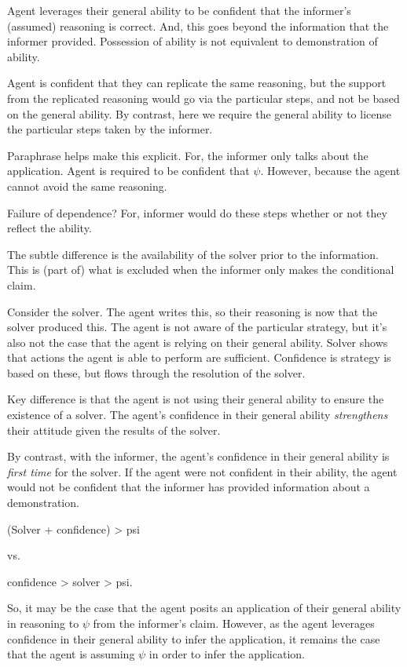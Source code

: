 \documentclass[10pt]{article}
\newcommand{\hozlinedash}[0]{%
  \noindent\hdashrule[0.5ex][c]{\textwidth}{.1pt}{2.5pt}
}
\begin{document}
\hozlinedash

Agent leverages their general ability to be confident that the informer's (assumed) reasoning is correct.
And, this goes beyond the information that the informer provided.
Possession of ability is not equivalent to demonstration of ability.

Agent is confident that they can replicate the same reasoning, but the support from the replicated reasoning would go via the particular steps, and not be based on the general ability.
By contrast, here we require the general ability to license the particular steps taken by the informer.

Paraphrase helps make this explicit.
For, the informer only talks about the application.
Agent is required to be confident that \(\psi\).
However, because the agent cannot avoid the same reasoning.

Failure of dependence?
For, informer would do these steps whether or not they reflect the ability.

The subtle difference is the availability of the solver prior to the information.
This is (part of) what is excluded when the informer only makes the conditional claim.

Consider the solver.
The agent writes this, so their reasoning is now that the solver produced this.
The agent is not aware of the particular strategy, but it's also not the case that the agent is relying on their general ability.
Solver shows that actions the agent is able to perform are sufficient.
Confidence is strategy is based on these, but flows through the resolution of the solver.

Key difference is that the agent is not using their general ability to ensure the existence of a solver.
The agent's confidence in their general ability \emph{strengthens} their attitude given the results of the solver.

By contrast, with the informer, the agent's confidence in their general ability is \emph{first time} for the solver.
If the agent were not confident in their ability, the agent would not be confident that the informer has provided information about a demonstration.

(Solver + confidence) > psi

vs.\

confidence  > solver > psi.

So, it may be the case that the agent posits an application of their general ability in reasoning to \(\psi\) from the informer's claim.
However, as the agent leverages confidence in their general ability to infer the application, it remains the case that the agent is assuming \(\psi\) in order to infer the application.
\end{document}
